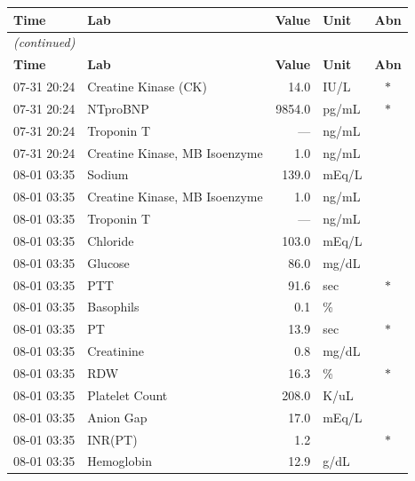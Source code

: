\documentclass[12pt, a4paper]{article}
\begin{document}
\medskip
{\scriptsize\setlength{\tabcolsep}{3pt}
\begin{longtable}{l p{4.5cm} r l c}
\toprule
\textbf{Time} & \textbf{Lab} & \textbf{Value} & \textbf{Unit} & \textbf{Abn} \\
\midrule
\endfirsthead
\multicolumn{5}{l}{\small\itshape (continued)} \\
\toprule
\textbf{Time} & \textbf{Lab} & \textbf{Value} & \textbf{Unit} & \textbf{Abn} \\
\midrule
\endhead
\bottomrule
\endlastfoot
07-31 20:24 & Creatine Kinase (CK)          & 14.0   & IU/L   & $*$ \\
07-31 20:24 & NTproBNP                       & 9854.0 & pg/mL  & $*$ \\
07-31 20:24 & Troponin T                     & ---    & ng/mL  &     \\
07-31 20:24 & Creatine Kinase, MB Isoenzyme  & 1.0    & ng/mL  &     \\
08-01 03:35 & Sodium                         & 139.0  & mEq/L  &     \\
08-01 03:35 & Creatine Kinase, MB Isoenzyme  & 1.0    & ng/mL  &     \\
08-01 03:35 & Troponin T                     & ---    & ng/mL  &     \\
08-01 03:35 & Chloride                       & 103.0  & mEq/L  &     \\
08-01 03:35 & Glucose                        & 86.0   & mg/dL  &     \\
08-01 03:35 & PTT                            & 91.6   & sec    & $*$ \\
08-01 03:35 & Basophils                      & 0.1    & \%     &     \\
08-01 03:35 & PT                             & 13.9   & sec    & $*$ \\
08-01 03:35 & Creatinine                     & 0.8    & mg/dL  &     \\
08-01 03:35 & RDW                            & 16.3   & \%     & $*$ \\
08-01 03:35 & Platelet Count                 & 208.0  & K/uL   &     \\
08-01 03:35 & Anion Gap                      & 17.0   & mEq/L  &     \\
08-01 03:35 & INR(PT)                        & 1.2    &        & $*$ \\
08-01 03:35 & Hemoglobin                     & 12.9   & g/dL   &     \\

\end{longtable}}
\end{document}
